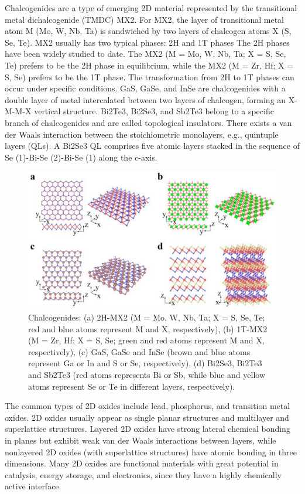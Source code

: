 \documentclass[12pt,a4paper]{report}
\begin{document}
\begin{itemize}
    Chalcogenides are a type of emerging 2D material represented by the transitional metal dichalcogenide (TMDC) MX2. For MX2, the layer of transitional metal atom M (Mo, W, Nb, Ta) is sandwiched by two layers of chalcogen atoms X (S, Se, Te). MX2 usually has two typical phases: 2H and 1T phases The 2H phases have been widely studied to date. The MX2 (M = Mo, W, Nb, Ta; X = S, Se, Te) prefers to be the 2H phase in equilibrium, while the MX2 (M = Zr, Hf; X = S, Se) prefers to be the 1T phase. The transformation from 2H to 1T phases can occur under specific conditions. GaS, GaSe, and InSe are chalcogenides with a double layer of metal intercalated between two layers of chalcogen, forming an X-M-M-X vertical structure. Bi2Te3, Bi2Se3, and Sb2Te3 belong to a specific branch of chalcogenides and are called topological insulators. There exists a van der Waals interaction between the stoichiometric monolayers, e.g., quintuple layers (QLs). A Bi2Se3 QL comprises five atomic layers stacked in the sequence of Se (1)-Bi-Se (2)-Bi-Se (1) along the c-axis.
    
    \begin{figure}
      \centering
      \includegraphics[scale=0.3]{2.3.jpg}
      \caption{Chalcogenides: (a) 2H-MX2 (M = Mo, W, Nb, Ta; X = S, Se, Te; red and blue atoms represent M and X, respectively), (b) 1T-MX2 (M = Zr, Hf; X = S, Se; green and red atoms represent M and X, respectively), (c) GaS, GaSe and InSe (brown and blue atoms represent Ga or In and S or Se, respectively), (d) Bi2Se3, Bi2Te3 and Sb2Te3 (red atoms represents Bi or Sb, while blue and yellow atoms represent Se or Te in different layers, respectively).}
      \label{xenefam}
      \end{figure}

      The common types of 2D oxides include lead, phosphorus, and transition metal oxides. 2D oxides usually appear as single planar structures and multilayer and superlattice structures. Layered 2D oxides have strong lateral chemical bonding in planes but exhibit weak van der Waals interactions between layers, while nonlayered 2D oxides (with superlattice structures) have atomic bonding in three dimensions. Many 2D oxides are functional materials with great potential in catalysis, energy storage, and electronics, since they have a highly chemically active interface.
      

\end{itemize}
\end{document}
